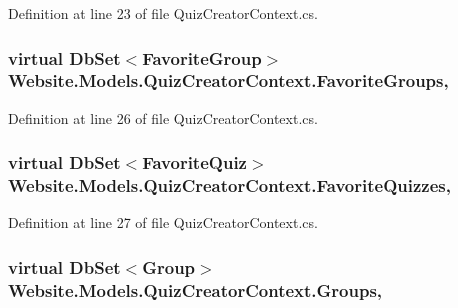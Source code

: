 Definition at line 23 of file Quiz\+Creator\+Context.\+cs.

\hypertarget{class_website_1_1_models_1_1_quiz_creator_context_ab61dfe4f34469ca14f09532dfb15e976}{}
\subsubsection[{Favorite\+Groups}]{\setlength{\rightskip}{0pt plus 5cm}virtual Db\+Set$<${\bf Favorite\+Group}$>$ Website.\+Models.\+Quiz\+Creator\+Context.\+Favorite\+Groups\hspace{0.3cm}{\ttfamily [get]}, {\ttfamily [set]}}\label{class_website_1_1_models_1_1_quiz_creator_context_ab61dfe4f34469ca14f09532dfb15e976}


Definition at line 26 of file Quiz\+Creator\+Context.\+cs.

\hypertarget{class_website_1_1_models_1_1_quiz_creator_context_a34827aea33ab169e46052064ea1a1f0e}{}
\subsubsection[{Favorite\+Quizzes}]{\setlength{\rightskip}{0pt plus 5cm}virtual Db\+Set$<${\bf Favorite\+Quiz}$>$ Website.\+Models.\+Quiz\+Creator\+Context.\+Favorite\+Quizzes\hspace{0.3cm}{\ttfamily [get]}, {\ttfamily [set]}}\label{class_website_1_1_models_1_1_quiz_creator_context_a34827aea33ab169e46052064ea1a1f0e}


Definition at line 27 of file Quiz\+Creator\+Context.\+cs.

\hypertarget{class_website_1_1_models_1_1_quiz_creator_context_a1c4307f03e443a4cacc4c1d4b79fef18}{}
\subsubsection[{Groups}]{\setlength{\rightskip}{0pt plus 5cm}virtual Db\+Set$<${\bf Group}$>$ Website.\+Models.\+Quiz\+Creator\+Context.\+Groups\hspace{0.3cm}{\ttfamily [get]}, {\ttfamily [set]}}\label{class_website_1_1_models_1_1_quiz_creator_context_a1c4307f03e443a4cacc4c1d4b79fef18}


